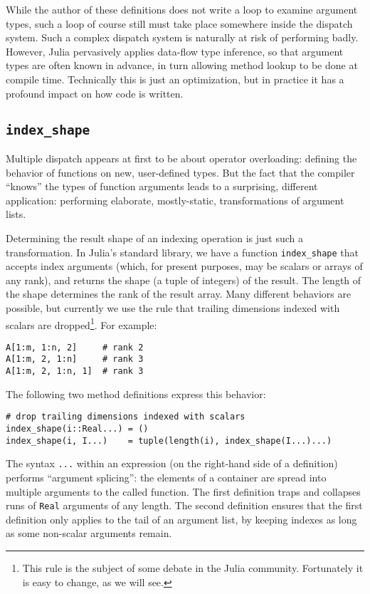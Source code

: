 \documentclass[preprint]{sigplanconf}
\newcommand{\code}[1]{\texttt{#1}}
\begin{document}
While the author of these definitions does not write a loop to examine
argument types, such a loop of course still must take place somewhere inside
the dispatch system. Such a complex dispatch system is naturally at risk of
performing badly. However, Julia pervasively applies data-flow type
inference, so that argument types are often known in advance, in turn
allowing method lookup to be done at compile time. Technically this is
just an optimization, but in practice it has a profound impact on how code
is written.

\subsection{\texttt{index\_shape}}

Multiple dispatch appears at first to be about operator overloading:
defining the behavior of functions on new, user-defined types.
But the fact that the compiler ``knows'' the types of function arguments leads
to a surprising, different application: performing elaborate, mostly-static,
transformations of argument lists.

Determining the result shape of an indexing operation is just such a
transformation. In Julia's standard library, we have a function
\texttt{index\_shape} that accepts index arguments (which, for present
purposes, may be scalars or arrays of any rank), and returns the
shape (a tuple of integers) of the result. The length of the shape
determines the rank of the result array. Many different behaviors
are possible, but currently we use the rule that trailing dimensions
indexed with scalars are dropped\footnote{This rule is the subject of
some debate in the Julia community. Fortunately it is easy to change,
as we will see.}.
For example:

\begin{verbatim}
A[1:m, 1:n, 2]     # rank 2
A[1:m, 2, 1:n]     # rank 3
A[1:m, 2, 1:n, 1]  # rank 3
\end{verbatim}

The following two method definitions express this behavior:

{\small
\begin{verbatim}
# drop trailing dimensions indexed with scalars
index_shape(i::Real...) = ()
index_shape(i, I...)    = tuple(length(i), index_shape(I...)...)
\end{verbatim}
}

The syntax \code{...} within an expression (on the right-hand side of
a definition) performs ``argument splicing'': the elements of a container
are spread into multiple arguments to the called function.
The first definition traps and collapses runs of \code{Real} arguments of
any length. The second definition ensures that the first definition only
applies to the tail of an argument list, by keeping indexes as long as
some non-scalar arguments remain.
\end{document}

